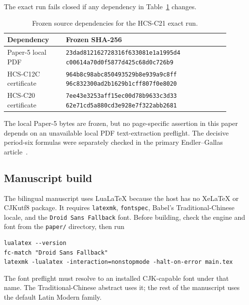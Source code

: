The exact run fails closed if any dependency in
Table~\ref{tab:source-locks} changes.
\begin{table}[htbp]
\centering
\begin{tabular}{p{0.24\linewidth}p{0.67\linewidth}}
\toprule
Dependency & Frozen SHA-256 \\
\midrule
Paper-5 local PDF
 & {\small\texttt{23dad812162728316f633081e1a1995d4}\newline
    \texttt{c00614a70d0f5877d425c68d0c726b9}} \\
HCS-C12C certificate
 & {\small\texttt{964b8c98abc850493529b8e939a9c8ff}\newline
    \texttt{96c832300ad2b1629b1cff807f0e8020}} \\
HCS-C20 certificate
 & {\small\texttt{7ee43e3253aff15ec00d78b9633c3d33}\newline
    \texttt{62e71cd5a880cd3e928e7f322abb2681}} \\
\bottomrule
\end{tabular}
\caption{Frozen source dependencies for the HCS-C21 exact run.}
\label{tab:source-locks}
\end{table}
The local Paper-5 bytes are frozen, but no page-specific assertion in this
paper depends on an unavailable local PDF text-extraction preflight.  The
decisive period-six formulas were separately checked in the primary
Endler--Gallas article~\cite[Eq.~(15)]{endlergallas2006chiral}.

\subsection{Manuscript build}

The bilingual manuscript uses LuaLaTeX because the host has no XeLaTeX or
CJKutf8 package.  It requires \texttt{latexmk}, \texttt{fontspec}, Babel's
Traditional-Chinese locale, and the \texttt{Droid Sans Fallback} font.
Before building, check the engine and font from the \texttt{paper/}
directory, then run
\begin{verbatim}
lualatex --version
fc-match "Droid Sans Fallback"
latexmk -lualatex -interaction=nonstopmode -halt-on-error main.tex
\end{verbatim}
The font preflight must resolve to an installed CJK-capable font under that
name.  The Traditional-Chinese abstract uses it; the rest of the manuscript
uses the default Latin Modern family.
